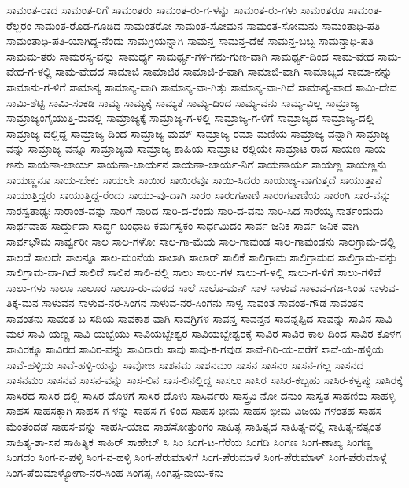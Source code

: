 ಸಾಮಂತ-ರಾದ
ಸಾಮಂತ-ರಿಗೆ
ಸಾಮಂತರು
ಸಾಮಂತ-ರು-ಗ-ಳನ್ನು
ಸಾಮಂತ-ರು-ಗಳು
ಸಾಮಂತರೂ
ಸಾಮಂತ-ರೆಲ್ಲರಂ
ಸಾಮಂತ-ರೊಡ-ಗೂಡಿದ
ಸಾಮಂತರೋ
ಸಾಮಂತ-ಸೋಮನ
ಸಾಮಂತ-ಸೋಮನು
ಸಾಮಂತಾಧಿ-ಪತಿ
ಸಾಮಂತಾಧಿ-ಪತಿ-ಯಾಗಿದ್ದ-ನೆಂದು
ಸಾಮಗ್ರಿಯನ್ನಾಗಿ
ಸಾಮನ್ತ
ಸಾಮನ್ತ-ದೆಱೆ
ಸಾಮನ್ತ-ಬಬ್ಬ
ಸಾಮನ್ತಾಧಿ-ಪತಿ
ಸಾಮಮ-ತರು
ಸಾಮರಸ್ಯ-ವನ್ನು
ಸಾಮರ್ಥ್ಯ
ಸಾಮರ್ಥ್ಯ-ಗಳಿ-ಗನು-ಗುಣ-ವಾಗಿ
ಸಾಮರ್ಥ್ಯ-ದಿಂದ
ಸಾಮ-ವೇದ
ಸಾಮ-ವೇದ-ಗ-ಳಲ್ಲಿ
ಸಾಮ-ವೇದದ
ಸಾಮಾಜಿ
ಸಾಮಾಜಿಕ
ಸಾಮಾಜಿ-ಕ-ವಾಗಿ
ಸಾಮಾಜಿ-ವಾಗಿ
ಸಾಮಾಜ್ಯದ
ಸಾಮಾ-ನನ್ನು
ಸಾಮಾನು-ಗ-ಳಿಗೆ
ಸಾಮಾನ್ಯ
ಸಾಮಾನ್ಯ-ವಾಗಿ
ಸಾಮಾನ್ಯ-ವಾ-ಗಿತ್ತು
ಸಾಮಾನ್ಯ-ವಾ-ಗಿದೆ
ಸಾಮಾನ್ಯ-ವಾದ
ಸಾಮಿ-ದೇವ
ಸಾಮಿ-ಶೆಟ್ಟಿ
ಸಾಮಿ-ಸಂಕಡಿ
ಸಾಮ್ಯ
ಸಾಮ್ಯಕ್ಕೆ
ಸಾಮ್ಯತೆ
ಸಾಮ್ಯ-ದಿಂದ
ಸಾಮ್ಯ-ವನು
ಸಾಮ್ಯ-ವಿಲ್ಲ
ಸಾಮ್ರಾಜ್ಯ
ಸಾಮ್ರಾಜ್ಯಂಗೈಯುತ್ತಿ-ರುವಲ್ಲಿ
ಸಾಮ್ರಾಜ್ಯಕ್ಕೆ
ಸಾಮ್ರಾಜ್ಯ-ಗ-ಳಲ್ಲಿ
ಸಾಮ್ರಾಜ್ಯ-ಗ-ಳಿಗೆ
ಸಾಮ್ರಾಜ್ಯದ
ಸಾಮ್ರಾಜ್ಯ-ದಲ್ಲಿ
ಸಾಮ್ರಾಜ್ಯ-ದಲ್ಲಿದ್ದ
ಸಾಮ್ರಾಜ್ಯ-ದಿಂದ
ಸಾಮ್ರಾಜ್ಯ-ಮಮ್
ಸಾಮ್ರಾಜ್ಯ-ರಮಾ-ಮಣಿಯ
ಸಾಮ್ರಾಜ್ಯ-ವನ್ನಾಗಿ
ಸಾಮ್ರಾಜ್ಯ-ವನ್ನು
ಸಾಮ್ರಾಜ್ಯ-ವನ್ನೂ
ಸಾಮ್ರಾಜ್ಯವು
ಸಾಮ್ರಾಜ್ಯ-ಶಾಹಿಯ
ಸಾಮ್ರಾಟ-ರಲ್ಲಿಯೇ
ಸಾಮ್ರಾಟ-ರಾದ
ಸಾಯಣ
ಸಾಯ-ಣನು
ಸಾಯಣಾ-ಚಾರ್ಯ
ಸಾಯಣಾ-ಚಾರ್ಯನ
ಸಾಯಣಾ-ಚಾರ್ಯ-ನಿಗೆ
ಸಾಯಣಾರ್ಯ
ಸಾಯಣ್ಣ
ಸಾಯಣ್ಣನು
ಸಾಯಣ್ಣನೂ
ಸಾಯ-ಬೇಕು
ಸಾಯಲೇ
ಸಾಯಿರ
ಸಾಯಿರವೂ
ಸಾಯಿ-ಸಿದರು
ಸಾಯುಜ್ಯ-ವಾಗುತ್ತದೆ
ಸಾಯುತ್ತಾನೆ
ಸಾಯುತ್ತಿದ್ದರು
ಸಾಯುತ್ತಿದ್ದ-ರೆಂದು
ಸಾಯು-ವು-ದಾಗಿ
ಸಾರಂ
ಸಾರಂಗಪಾಣಿ
ಸಾರಂಗಪಾಣಿಯ
ಸಾರಂಗಿ
ಸಾರ-ವನ್ನು
ಸಾರಸ್ವತಾಢ್ಯಃ
ಸಾರಾಂಶ-ವನ್ನು
ಸಾರಿಗೆ
ಸಾರಿದ
ಸಾರಿ-ದ-ರೆಂದು
ಸಾರಿ-ದ-ವನು
ಸಾರಿ-ಸಿದ
ಸಾರೆಯ್ಕ
ಸಾರ್ತಂದುದು
ಸಾರ್ಥವಾಹ
ಸಾರ್ದ್ದುದಾ
ಸಾರ್ದ್ಧ-ಬಂಧಾದಿ-ಕರ್ಮಸ್ವಕಂ
ಸಾರ್ಧಮಿದಂ
ಸಾರ್ವ-ಜನಿಕ
ಸಾರ್ವ-ಜನಿಕ-ವಾಗಿ
ಸಾರ್ವಭೌಮ
ಸಾರ್ವ್ವರೀ
ಸಾಲ
ಸಾಲ-ಗಳೋ
ಸಾಲ-ಗಾ-ಮೆಯ
ಸಾಲ-ಗಾವುಂಡ
ಸಾಲ-ಗಾವುಂಡನು
ಸಾಲಗ್ರಾಮ-ದಲ್ಲಿ
ಸಾಲದೆ
ಸಾಲದೇ
ಸಾಲನ್ನೂ
ಸಾಲ-ಮಂನೆಯ
ಸಾಲಾಗಿ
ಸಾಲಾರ್
ಸಾಲಿಕೆ
ಸಾಲಿಗ್ರಾಮ
ಸಾಲಿಗ್ರಾಮದ
ಸಾಲಿಗ್ರಾಮ-ವನ್ನು
ಸಾಲಿಗ್ರಾಮ-ವಾ-ಗಿದೆ
ಸಾಲಿದೆ
ಸಾಲಿನ
ಸಾಲಿ-ನಲ್ಲಿ
ಸಾಲು
ಸಾಲು-ಗಳ
ಸಾಲು-ಗ-ಳಲ್ಲಿ
ಸಾಲು-ಗ-ಳಿಗೆ
ಸಾಲು-ಗಳಿವೆ
ಸಾಲು-ಗಳು
ಸಾಲೂ
ಸಾಲೂರ
ಸಾಲೂ-ರು-ಮಠದ
ಸಾಲೆ
ಸಾಲೊ-ಮನ್
ಸಾಳ
ಸಾಳುವ
ಸಾಳುವ-ಗಜ-ಸಿಂಹ
ಸಾಳುವ-ತಿಕ್ಕ-ಮನ
ಸಾಳುವನ
ಸಾಳುವ-ನರ-ಸಿಂಗನ
ಸಾಳುವ-ನರ-ಸಿಂಗನು
ಸಾಳ್ವ
ಸಾವಂತ
ಸಾವಂತ-ಗೌಡ
ಸಾವಂತನ
ಸಾವಂತನು
ಸಾವಂತ-ಬ-ಸದಿಯ
ಸಾವಕಾಶ-ವಾಗಿ
ಸಾವಗ್ರಿಗಳ
ಸಾವನ್ತ
ಸಾವನ್ತನ
ಸಾವನ್ನಪ್ಪಿದ
ಸಾವನ್ನು
ಸಾವಿನ
ಸಾವಿ-ಮಲೆ
ಸಾವಿ-ಯಣ್ಣ
ಸಾವಿ-ಯಬ್ಬೆಯು
ಸಾವಿಯಬ್ಬೇಶ್ವರ
ಸಾವಿಯಬ್ಬೇಶ್ವರಕ್ಕೆ
ಸಾವಿರ
ಸಾವಿರ-ಕಾಲ-ದಿಂದ
ಸಾವಿರ-ಕೊಳಗ
ಸಾವಿರಕ್ಕೂ
ಸಾವಿರದ
ಸಾವಿರ-ವನ್ನು
ಸಾವಿರಾರು
ಸಾವು
ಸಾವು-ಕ-ಗವುಡ
ಸಾವೆ-ಗಿರಿ-ಯ-ವರೆಗೆ
ಸಾವೆ-ಯ-ಹಳ್ಳಿಯ
ಸಾವೆ-ಹಳ್ಳಿಯ
ಸಾವೆ-ಹಳ್ಳಿ-ಯನ್ನು
ಸಾವೋಜ
ಸಾಶನಮ
ಸಾಶನಮಂ
ಸಾಸನ
ಸಾಸನಂ
ಸಾಸನ-ಗಲ್ಲ
ಸಾಸನದ
ಸಾಸನಮಂ
ಸಾಸನವ
ಸಾಸನ-ವನ್ನು
ಸಾಸ-ಲಿನ
ಸಾಸ-ಲಿನಲ್ಲಿದ್ದ
ಸಾಸಲು
ಸಾಸಿರ
ಸಾಸಿರ-ಕಬ್ಬಹು
ಸಾಸಿರ-ಕಳ್ವಪ್ಪು
ಸಾಸಿರಕ್ಕೆ
ಸಾಸಿರದ
ಸಾಸಿರ-ದಲ್ಲಿ
ಸಾಸಿರ-ದೊಳಗೆ
ಸಾಸಿರ-ದೊಳು
ಸಾಸಿರ್ವರು
ಸಾಸ್ತ್ರವಿ-ನೋ-ದನುಂ
ಸಾಸ್ವತ
ಸಾಹಣಿರು
ಸಾಹಳ್ಳಿ
ಸಾಹಸ
ಸಾಹಸಕ್ಕಾಗಿ
ಸಾಹಸ-ಗ-ಳನ್ನು
ಸಾಹಸ-ಗ-ಳಿಂದ
ಸಾಹಸ-ಭೀಮ
ಸಾಹಸ-ಭೀಮ-ವಿಜಯ-ಗಳಂತಹ
ಸಾಹಸ-ಮೆಂತೆಂದಡೆ
ಸಾಹಸ-ವನ್ನು
ಸಾಹಸಿ-ಯಾದ
ಸಾಹಸೋತ್ತುಂಗಂ
ಸಾಹಿತ್ಯ
ಸಾಹಿತ್ಯದ
ಸಾಹಿತ್ಯ-ದಲ್ಲಿ
ಸಾಹಿತ್ಯ-ನತ್ಯಂತ
ಸಾಹಿತ್ಯ-ಶಾ-ಸನ
ಸಾಹಿತ್ಯಿಕ
ಸಾಹಿರ್
ಸಾಹೇಬ್
ಸಿ
ಸಿಂ
ಸಿಂಗ-ಟ-ಗೆರೆಯ
ಸಿಂಗಡಿ
ಸಿಂಗಣ
ಸಿಂಗ-ಣಾಖ್ಯ
ಸಿಂಗಣ್ಣ
ಸಿಂಗದಂ
ಸಿಂಗ-ನ-ಪಳ್ಳಿ
ಸಿಂಗ-ನ-ಹಳ್ಳಿ
ಸಿಂಗ-ಪೆರುಮಾಳಿಗೆ
ಸಿಂಗ-ಪೆರುಮಾಳೆ
ಸಿಂಗ-ಪೆರುಮಾಳ್
ಸಿಂಗ-ಪೆರುಮಾಳ್ಗೆ
ಸಿಂಗ-ಪೆರುಮಾಳ್ಯೋಗಾ-ನರ-ಸಿಂಹ
ಸಿಂಗಪ್ಪ
ಸಿಂಗಪ್ಪ-ನಾಯ-ಕನು
